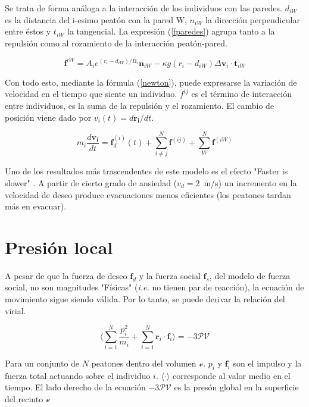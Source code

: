 Se trata de forma análoga a la interacción de los individuos con las paredes. $d_{iW}$ es la distancia del i-esimo peatón con la pared W, $n_{iW}$ la dirección perpendicular entre éstos y $t_{iW}$ la tangencial. La expresión (\ref{fparedes}) agrupa tanto a la repulsión como al rozamiento de la interacción peatón-pared.

\begin{equation}
\mathbf{f}^{iW}=A_ie^{(r_{i}-d_{iW})/B_i}\mathbf{n}_{iW}-\kappa g(r_{i}-d_{iW})\Delta \mathbf{v}_{i}\cdot\mathbf{t}_{iW}
\label{fparedes}
\end{equation} 

Con todo esto, mediante la fórmula (\ref{newton}), puede expresarse la variación de velocidad en el tiempo que siente un individuo. $f^{ij}$ es el término de interacción entre individuos, es la suma de la repulsión y el rozamiento. El cambio de posición viene dado por $v_{i}(t)=d\mathbf{r_i}/dt$.

\begin{equation}
m_i\frac{d\mathbf{v_i}}{dt}=\mathbf{f}_d^ {(i)}(t)+ \sum_{i\neq j}^{N}\mathbf{f}^{(ij)} + \sum_{W}^{N}\mathbf{f}^{(iW)}
\label{newton}
\end{equation}  

Uno de los resultados más trascendentes de este modelo es el efecto "Faster is slower" \cite{Helbing1}. A partir de cierto grado de ansiedad ($v_d=2$~m/s) un incremento en la velocidad de deseo produce evacuaciones menos eficientes (los peatones tardan más en evacuar). 
 
\section{Presión local}

A pesar de que la fuerza de deseo $\mathbf{f}_d$ y la fuerza social $\mathbf{f}_s$, del modelo de fuerza social, no son magnitudes "Físicas" (\textit{i.e.} no tienen par de reacción), la ecuación de movimiento sigue siendo válida. Por lo tanto, se puede derivar la relación del virial\cite{lion}. 

\begin{equation}
 \bigg\langle\displaystyle\sum_{i=1}^N\displaystyle\frac{p_i^2}{m_i} + 
\displaystyle\sum_{i=1}^N 
\mathbf{r}_i\cdot\mathbf{f}_i\bigg\rangle=-3\mathcal{PV}\label{virial1}
\end{equation}


\noindent Para un conjunto de $N$ peatones dentro del volumen $\mathcal{v}$. $p_i$  y $\mathbf{f}_i$ son el impulso y la fuerza total actuando sobre el individuo $i$. $\langle\cdot\rangle$ corresponde al valor medio en el tiempo. El lado derecho de la ecuación $-3\mathcal{PV}$ es la presón global en la superficie del recinto $\mathcal{v}$   \\

